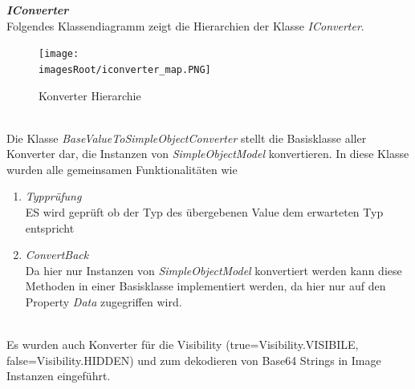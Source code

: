 \documentclass[11pt, a4paper, twoside]{article}   	%
\newcommand{\imagesRoot}{images}
\begin{document}
\newpage
\textbf{\emph{IConverter}}\\
Folgendes Klassendiagramm zeigt die Hierarchien der Klasse \emph{IConverter}.
\begin{figure}[h]
	\centering
	\texttt{[image: \\imagesRoot/iconverter\_map.PNG]}
	\caption
	{Konverter Hierarchie}
\end{figure}
\ \\
Die Klasse \emph{BaseValueToSimpleObjectConverter} stellt die Basisklasse aller Konverter dar, die Instanzen von \emph{SimpleObjectModel} konvertieren. In diese Klasse wurden alle gemeinsamen Funktionalitäten wie 
\begin{enumerate}
	\item\emph{Typprüfung}\\
	ES wird geprüft ob der Typ des übergebenen Value dem erwarteten Typ entspricht
	\item\emph{ConvertBack}\\
	Da hier nur Instanzen von \emph{SimpleObjectModel} konvertiert werden kann diese Methoden in einer Basisklasse implementiert werden, da hier nur auf den Property \emph{Data} zugegriffen wird.
\end{enumerate}
\ \\
Es wurden auch Konverter für die Visibility (true=Visibility.VISIBILE, false=Visibility.HIDDEN) und zum dekodieren von Base64 Strings in Image Instanzen eingeführt.

\newpage
\end{document}
